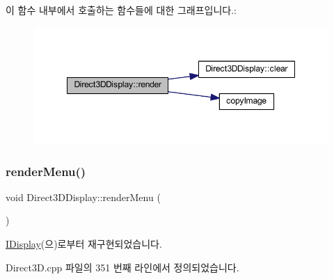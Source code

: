 이 함수 내부에서 호출하는 함수들에 대한 그래프입니다.\+:
\nopagebreak
\begin{figure}[H]
\begin{center}
\leavevmode
\includegraphics[width=348pt]{class_direct3_d_display_a1c789bf663cfd32bb2827b9a0f0429c7_cgraph}
\end{center}
\end{figure}
\mbox{\label{class_direct3_d_display_a099bbef2eaaf90efb3ecb00c68103fe7}} 
\subsubsection{\texorpdfstring{render\+Menu()}{renderMenu()}}
{\footnotesize\ttfamily void Direct3\+D\+Display\+::render\+Menu (\begin{DoxyParamCaption}{ }\end{DoxyParamCaption})\hspace{0.3cm}{\ttfamily [virtual]}}



\mbox{\hyperlink{class_i_display_ad6fc199a615635440ca01485c1283d41}{I\+Display}}(으)로부터 재구현되었습니다.



Direct3\+D.\+cpp 파일의 351 번째 라인에서 정의되었습니다.



